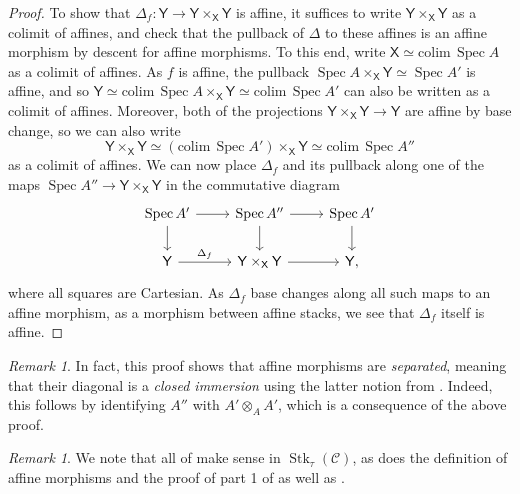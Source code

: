 \documentclass[11pt, a4paper]{article}
\DeclareMathOperator{\Spec}{Spec}
\newcommand{\1}{\mathbf{1}}
\DeclareMathOperator{\Stk}{Stk}
\newcommand{\colim}{\mathrm{colim}\,}
\newcommand{\calC}{\mathcal{C}}
\newcommand{\X}{\mathsf{X}}
\newcommand{\Y}{\mathsf{Y}}
\newcommand{\sfY}{\mathsf{Y}}
\theoremstyle{plain}
\theoremstyle{definition}
\theoremstyle{remark}\numberwithin{equation}{section}
\newtheorem{remark}[equation]{Remark}
\begin{document}
\begin{proof}
    To show that $\Delta_f\colon \Y \to \Y\times_\X \Y$ is affine, it suffices to write $\Y\times_\X \Y$ as a colimit of affines, and check that the pullback of $\Delta$ to these affines is an affine morphism by descent for affine morphisms. To this end, write $\X \simeq \colim \Spec A$ as a colimit of affines. As $f$ is affine, the pullback $\Spec A\times_\X \Y \simeq \Spec A'$ is affine, and so $\Y \simeq \colim \Spec A\times_\X \Y\simeq \colim \Spec A'$ can also be written as a colimit of affines. Moreover, both of the projections $\Y\times_\X \Y \to \Y$ are affine by base change, so we can also write
    \[\Y\times_\X \Y \simeq (\colim \Spec A') \times_{\X} \Y \simeq \colim \Spec A''\]
    as a colimit of affines. We can now place $\Delta_f$ and its pullback along one of the maps $\Spec A'' \to \Y\times_\X \Y$ in the commutative diagram
    \[\begin{tikzcd}
        {\Spec A'}\ar[r]\ar[d]  &   {\Spec A''}\ar[d]\ar[r] &   {\Spec A'}\ar[d]    \\
        {\sfY}\ar[r, "{\Delta_f}"]  &   {\Y\times_\X \Y}\ar[r]  &   {\Y,}
    \end{tikzcd}\]
    where all squares are Cartesian. As $\Delta_f$ base changes along all such maps to an affine morphism, as a morphism between affine stacks, we see that $\Delta_f$ itself is affine.
\end{proof}

\begin{remark}
    In fact, this proof shows that affine morphisms are \emph{separated}, meaning that their diagonal is a \emph{closed immersion} using the latter notion from \cite[Df.5.5.3]{temperedglobal}. Indeed, this follows by identifying $A''$ with $A'\otimes_A A'$, which is a consequence of the above proof.
\end{remark}

\begin{remark}
    We note that all of  make sense in $\Stk_\tau(\calC)$, as does the definition of affine morphisms and the proof of part 1 of  as well as .
\end{remark}


\scriptsize
 

\end{document}
